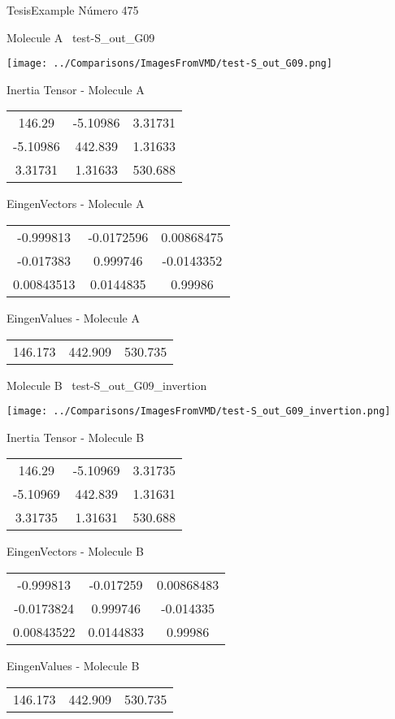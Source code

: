 \vtab[-3cm]
\begin{center}
{\large TesisExample \tab Número 475}
\end{center}
\begin{multicols}{2}
\begin{center}

Molecule A \
test-S\_out\_G09

\texttt{[image: ../Comparisons/ImagesFromVMD/test-S\_out\_G09.png]}

Inertia Tensor - Molecule A \\
\begin{tabular}{|c c c|}
146.29	 & 	-5.10986	 & 	3.31731	 \\
-5.10986	 & 	442.839	 & 	1.31633	 \\
3.31731	 & 	1.31633	 & 	530.688
\end{tabular}

\vtab
 EingenVectors - Molecule A     \\
\begin{tabular}{|c c c|}
-0.999813	 & 	-0.0172596	 & 	0.00868475	 \\
-0.017383	 & 	0.999746	 & 	-0.0143352	 \\
0.00843513	 & 	0.0144835	 & 	0.99986
\end{tabular}

\vtab
 EingenValues - Molecule A     \\
\begin{tabular}{|c c c|}
146.173	 & 	442.909	 & 	530.735	 \\
\end{tabular}
\columnbreak

Molecule B \
test-S\_out\_G09\_invertion

\texttt{[image: ../Comparisons/ImagesFromVMD/test-S\_out\_G09\_invertion.png]}

Inertia Tensor - Molecule B \\
\begin{tabular}{|c c c|}
146.29	 & 	-5.10969	 & 	3.31735	 \\
-5.10969	 & 	442.839	 & 	1.31631	 \\
3.31735	 & 	1.31631	 & 	530.688
\end{tabular}

\vtab
 EingenVectors - Molecule B     \\
\begin{tabular}{|c c c|}
-0.999813	 & 	-0.017259	 & 	0.00868483	 \\
-0.0173824	 & 	0.999746	 & 	-0.014335	 \\
0.00843522	 & 	0.0144833	 & 	0.99986
\end{tabular}

\vtab
 EingenValues - Molecule B     \\
\begin{tabular}{|c c c|}
146.173	 & 	442.909	 & 	530.735	 \\
\end{tabular}

\end{center}
\end{multicols}

